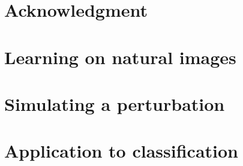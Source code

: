\documentclass[8pt, landscape]{sciposter}
\title{\Title}
\author{
{\color{MidnightBlue} \FirstNameA\ \AuthorA\ } 
{\color{OliveGreen} \FirstNameB\ \AuthorB\ }
{\color{MidnightBlue}  \FirstNameC\ \AuthorC\ }
}
\institute{
{\color{MidnightBlue} \InstituteA }  --- %
{\color{OliveGreen} \InstituteB }
}
\begin{document}


           
\maketitle

\begin{multicols}{4}

\begin{abstract}
\Abstract
\end{abstract}

%

\section*{Acknowledgment}

\Acknowledgments
%
\printbibliography

\columnbreak
\section{Learning on natural images}
\FigureMap

\columnbreak
\section{Simulating a perturbation}
\FigureQuant

\columnbreak
\section{Application to classification}
\FigureMNIST

\end{multicols}
\end{document}
